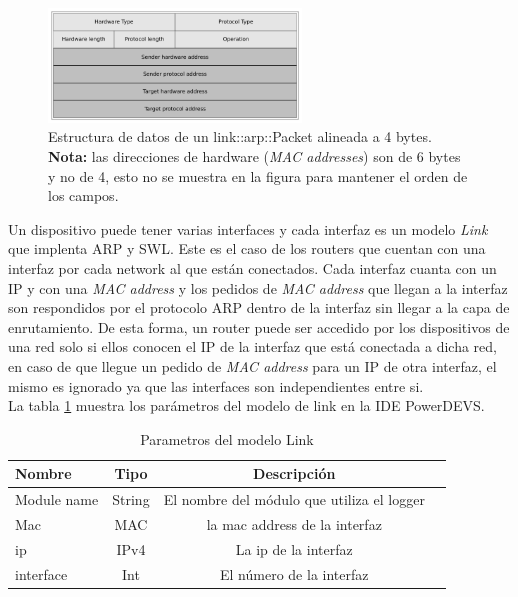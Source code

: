 \documentclass[10pt,a4paper]{article}
\begin{document}
\begin{figure}[!htb]
    \centering
    \includegraphics[width = 0.6\textwidth]{img/png/arp-packet.png}
    \caption{Estructura de datos de un link::arp::Packet alineada a 4 bytes. \textbf{Nota:} las direcciones de hardware (\textit{MAC addresses}) son de 6 bytes y no de 4, esto no se muestra en la figura para mantener el orden de los campos.}
    \label{figure: arp packet}
\end{figure}


Un dispositivo puede tener varias interfaces y cada interfaz es un modelo \textit{Link} que implenta ARP y SWL. Este es el caso de los routers que cuentan con una interfaz por cada network al que están conectados. Cada interfaz cuanta con un IP y con una \textit{MAC address} y los pedidos de \textit{MAC address} que llegan a la interfaz son respondidos por el protocolo ARP dentro de la interfaz sin llegar a la capa de enrutamiento. De esta forma, un router puede ser accedido por los dispositivos de una red solo si ellos conocen el IP de la interfaz que está conectada a dicha red, en caso de que llegue un pedido de \textit{MAC address} para un IP de otra interfaz, el mismo es ignorado ya que las interfaces son independientes entre si. \\

La tabla \ref{table: parameters link} muestra los parámetros del modelo de link en la IDE PowerDEVS.

\begin{table}[h]
\begin{tabular}{|l|c|c|c|}
  \hline
  Nombre & Tipo & Descripción \\
  \hline
  Module name & String & El nombre del módulo que utiliza el logger \\
  \hline
  Mac & MAC & la mac address de la interfaz \\
  \hline
  ip & IPv4 & La ip de la interfaz \\
  \hline
  interface & Int & El número de la interfaz \\
  \hline
\end{tabular}
\caption{Parametros del modelo Link}
\label{table: parameters link}
\end{table}
\end{document}
